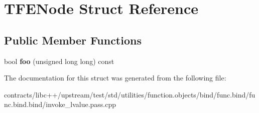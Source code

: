 \hypertarget{struct_t_f_e_node}{}\section{T\+F\+E\+Node Struct Reference}
\label{struct_t_f_e_node}
\subsection*{Public Member Functions}
\begin{DoxyCompactItemize}
\item 
\mbox{\label{struct_t_f_e_node_a0441938f4c698146e7a0520d5d328a0f}} 
bool {\bfseries foo} (unsigned long long) const
\end{DoxyCompactItemize}


The documentation for this struct was generated from the following file\+:\begin{DoxyCompactItemize}
\item 
contracts/libc++/upstream/test/std/utilities/function.\+objects/bind/func.\+bind/func.\+bind.\+bind/invoke\+\_\+lvalue.\+pass.\+cpp\end{DoxyCompactItemize}
